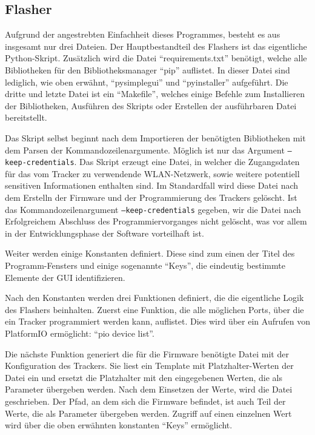 \subsection{Flasher}
Aufgrund der angestrebten Einfachheit dieses Programmes, besteht es aus insgesamt nur drei Dateien.
Der Hauptbestandteil des Flashers ist das eigentliche Python-Skript.
Zusätzlich wird die Datei \enquote{requirements.txt} benötigt, welche alle Bibliotheken für den
Bibliotheksmanager \enquote{pip} auflistet.
In dieser Datei sind lediglich, wie oben erwähnt, \enquote{pysimplegui} und \enquote{pyinstaller} aufgeführt.
Die dritte und letzte Datei ist ein \enquote{Makefile}, welches einige Befehle zum Installieren der Bibliotheken,
Ausführen des Skripts oder Erstellen der ausführbaren Datei bereitstellt.

Das Skript selbst beginnt nach dem Importieren der benötigten Bibliotheken mit dem Parsen der
Kommandozeilenargumente.
Möglich ist nur das Argument \texttt{--keep-credentials}.
Das Skript erzeugt eine Datei, in welcher die Zugangsdaten für das vom Tracker zu verwendende
\gls{WLAN}-Netzwerk, sowie weitere potentiell sensitiven Informationen enthalten sind. Im
Standardfall wird diese Datei nach dem Erstelln der Firmware und der Programmierung des Trackers
gelöscht. Ist das Kommandozeilenargument \texttt{--keep-credentials} gegeben, wir die Datei nach
Erfolgreichem Abschluss des Programmiervorganges nicht gelöscht, was vor allem in der
Entwicklungsphase der Software vorteilhaft ist.

Weiter werden einige Konstanten definiert.
Diese sind zum einen der Titel des Programm-Fensters und einige sogenannte \enquote{Keys},
die eindeutig bestimmte Elemente der \gls{GUI} identifizieren.

Nach den Konstanten werden drei Funktionen definiert, die die eigentliche Logik des Flashers beinhalten.
Zuerst eine Funktion, die alle möglichen Ports, über die ein Tracker programmiert werden kann, auflistet.
Dies wird über ein Aufrufen von PlatformIO ermöglicht: \enquote{pio device list}.

Die nächste Funktion generiert die für die Firmware benötigte Datei mit der Konfiguration des Trackers.
Sie liest ein Template mit Platzhalter-Werten der Datei ein und ersetzt die Platzhalter mit den eingegebenen Werten, die als Parameter übergeben werden.
Nach dem Einsetzen der Werte, wird die Datei geschrieben.
Der Pfad, an dem sich die Firmware befindet, ist auch Teil der Werte, die als Parameter übergeben werden.
Zugriff auf einen einzelnen Wert wird über die oben erwähnten konstanten \enquote{Keys} ermöglicht.

